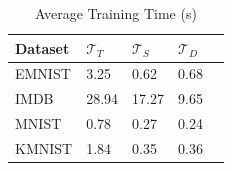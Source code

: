 \begin{table}
\caption{Average Training Time (s)}
\label{tab:training-time}
\begin{tabular}{lllll}
\toprule
Dataset & $\mathcal{T}_T$ & $\mathcal{T}_S$ & $\mathcal{T}_D$ \\
\midrule
EMNIST & 3.25 & 0.62 & 0.68 \\
IMDB & 28.94 & 17.27 & 9.65 \\
MNIST & 0.78 & 0.27 & 0.24 \\
KMNIST & 1.84 & 0.35 & 0.36 \\
\bottomrule
\end{tabular}
\end{table}

